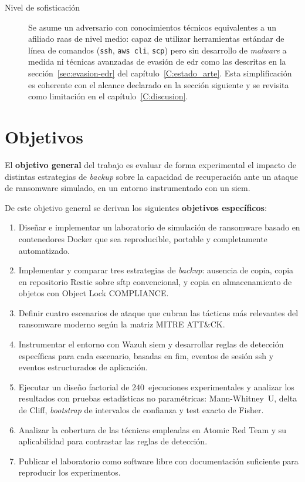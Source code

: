 \documentclass[../main.tex]{subfiles}
\begin{document}
\begin{description}
  \item[Nivel de sofisticación] Se asume un adversario con conocimientos técnicos
  equivalentes a un afiliado \gls{raas} de nivel medio: capaz de utilizar
  herramientas estándar de línea de comandos (\texttt{ssh}, \texttt{aws cli},
  \texttt{scp}) pero sin desarrollo de \emph{malware} a medida ni técnicas
  avanzadas de evasión de \gls{edr} como las descritas en la
  sección~\ref{sec:evasion-edr} del capítulo~\ref{C:estado_arte}. Esta
  simplificación es coherente con el alcance declarado en la sección siguiente y
  se revisita como limitación en el capítulo~\ref{C:discusion}.
\end{description}

\section{Objetivos}

El \textbf{objetivo general} del trabajo es evaluar de forma experimental
el impacto de distintas estrategias de \textit{backup} sobre la capacidad
de recuperación ante un ataque de ransomware simulado, en un entorno
instrumentado con un \gls{siem}.

De este objetivo general se derivan los siguientes \textbf{objetivos
específicos}:

\begin{enumerate}[label=OE\arabic*., leftmargin=2.5cm]
  \item Diseñar e implementar un laboratorio de simulación de ransomware
  basado en contenedores Docker que sea reproducible, portable y
  completamente automatizado.

  \item Implementar y comparar tres estrategias de \textit{backup}: ausencia
  de copia, copia en repositorio Restic sobre \gls{sftp} convencional, y
  copia en almacenamiento de objetos con Object Lock COMPLIANCE.

  \item Definir cuatro escenarios de ataque que cubran las tácticas más
  relevantes del ransomware moderno según la matriz MITRE ATT\&CK.

  \item Instrumentar el entorno con Wazuh \gls{siem} y desarrollar reglas
  de detección específicas para cada escenario, basadas en \gls{fim},
  eventos de sesión \gls{ssh} y eventos estructurados de aplicación.

  \item Ejecutar un diseño factorial de 240~ejecuciones experimentales y
  analizar los resultados con pruebas estadísticas no paramétricas:
  Mann-Whitney~U, delta de Cliff, \textit{bootstrap} de intervalos de
  confianza y test exacto de Fisher.

  \item Analizar la cobertura de las técnicas empleadas en Atomic Red Team
  y su aplicabilidad para contrastar las reglas de detección.

  \item Publicar el laboratorio como software libre con documentación
  suficiente para reproducir los experimentos.
\end{enumerate}
\end{document}
